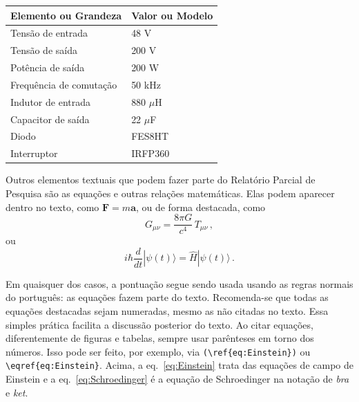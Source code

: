 \documentclass[a4paper,12pt]{article}
\begin{document}
\begin{quadro}[H]
\centering
\caption{Dimensionamento dos elementos de um conversor \textit{boost}}
\label{quadro:exemplo}
\begin{tabular}{|l|l|}
\hline
\rowcolor[gray]{0.9}
\textbf{Elemento ou Grandeza} & \textbf{Valor ou Modelo} \\
\hline
Tensão de entrada & 48 V \\
\hline
Tensão de saída & 200 V \\
\hline
Potência de saída & 200 W \\
\hline
Frequência de comutação & 50 kHz \\
\hline
Indutor de entrada & 880 $\mu$H \\
\hline
Capacitor de saída & 22 $\mu$F \\
\hline
Diodo & FES8HT \\
\hline
Interruptor & IRFP360 \\
\hline
\end{tabular}
\caption*{
    Fonte: Menegáz (1997).\\
    \textit{Descrição do Quadro~\ref{quadro:exemplo}:} o quadro apresenta duas colunas e nove linhas com bordas pretas visíveis em todas as divisões, com dados ilustrativos para demonstrar as normas de apresentação de dados.
}
\end{quadro}

Outros elementos textuais que podem fazer parte do Relatório Parcial de Pesquisa são as equações e outras relações matemáticas.  Elas podem aparecer dentro no texto, como $\mathbf F = m \mathbf a$, ou de forma destacada, como
\begin{equation} \label{eq:Einstein}
    G_{\mu \nu} = \frac{8 \pi G}{c^4} \, T_{\mu \nu} \, ,
\end{equation}
ou
\begin{equation} \label{eq:Schroedinger}
    i \hbar \frac{d}{dt} | \psi(t) \rangle = \hat H | \psi(t)\rangle \, .
\end{equation}

Em quaisquer dos casos, a pontuação segue sendo usada usando as regras normais do português: as equações fazem parte do texto. Recomenda-se que todas as equações destacadas sejam numeradas, mesmo as não citadas no texto. Essa simples prática facilita a discussão posterior do texto. Ao citar equações, diferentemente de figuras e tabelas, sempre usar parênteses em torno dos números. Isso pode ser feito, por exemplo, via \verb|(\ref{eq:Einstein})| ou \verb|\eqref{eq:Einstein}|. Acima, a eq.~\eqref{eq:Einstein} trata das equações de campo de Einstein e a eq.~\eqref{eq:Schroedinger} é a equação de Schroedinger na notação de \textit{bra} e \textit{ket}.
\end{document}
